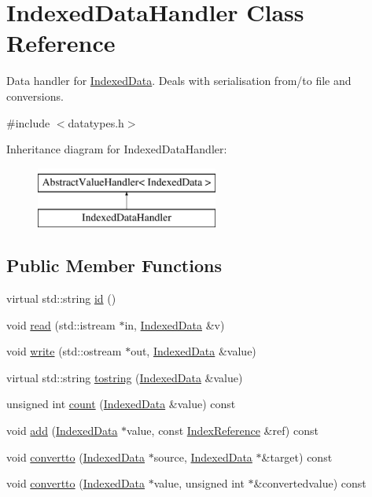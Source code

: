 \hypertarget{classIndexedDataHandler}{}\section{Indexed\+Data\+Handler Class Reference}
\label{classIndexedDataHandler}


Data handler for \hyperlink{classIndexedData}{Indexed\+Data}. Deals with serialisation from/to file and conversions.  




{\ttfamily \#include $<$datatypes.\+h$>$}

Inheritance diagram for Indexed\+Data\+Handler\+:\begin{figure}[H]
\begin{center}
\leavevmode
\includegraphics[height=2.000000cm]{classIndexedDataHandler}
\end{center}
\end{figure}
\subsection*{Public Member Functions}
\begin{DoxyCompactItemize}
\item 
virtual std\+::string \hyperlink{classIndexedDataHandler_a858b6661224371858487adf4515a929c}{id} ()
\item 
void \hyperlink{classIndexedDataHandler_ab24da9862e5572a9d6f58e51f62fb5c7}{read} (std\+::istream $\ast$in, \hyperlink{classIndexedData}{Indexed\+Data} \&v)
\item 
void \hyperlink{classIndexedDataHandler_adac292491ac7e7e59d15f0a8a76bfac7}{write} (std\+::ostream $\ast$out, \hyperlink{classIndexedData}{Indexed\+Data} \&value)
\item 
virtual std\+::string \hyperlink{classIndexedDataHandler_a7a3fd16bf83956b3fbc2fe46578aa958}{tostring} (\hyperlink{classIndexedData}{Indexed\+Data} \&value)
\item 
unsigned int \hyperlink{classIndexedDataHandler_a9ce91a864dceb5e7de23ee89d1083037}{count} (\hyperlink{classIndexedData}{Indexed\+Data} \&value) const 
\item 
void \hyperlink{classIndexedDataHandler_a242beac1d0b430238e3259556d2b1426}{add} (\hyperlink{classIndexedData}{Indexed\+Data} $\ast$value, const \hyperlink{classIndexReference}{Index\+Reference} \&ref) const 
\item 
void \hyperlink{classIndexedDataHandler_a5f4e87e6b1d952f9a1724168786bc99e}{convertto} (\hyperlink{classIndexedData}{Indexed\+Data} $\ast$source, \hyperlink{classIndexedData}{Indexed\+Data} $\ast$\&target) const 
\item 
void \hyperlink{classIndexedDataHandler_ab9ceda9fb27c913f8d14c25d714ac461}{convertto} (\hyperlink{classIndexedData}{Indexed\+Data} $\ast$value, unsigned int $\ast$\&convertedvalue) const 
\end{DoxyCompactItemize}

